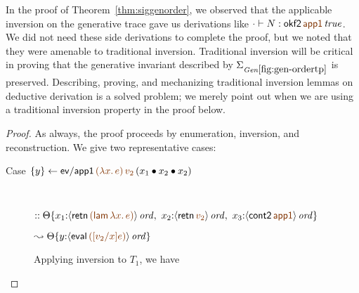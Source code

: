 \bigskip
In the proof of Theorem~\ref{thm:siggenorder}, we observed that the
applicable inversion on the generative trace gave us derivations like
$\cdot \vdash N : \isconc{{{\sf okf2}\,\lf{\sf app1}}}$. We did not need these
side derivations to complete the proof, but we noted that they were
amenable to traditional inversion. Traditional inversion will be
critical in proving that the generative invariant described by
$\siggenordertp$ is preserved. Describing, proving, and mechanizing
traditional inversion lemmas on deductive derivation is a solved
problem; we merely point out when we are using a traditional inversion
property in the proof below.


\begin{proof} As always, the proof proceeds by enumeration, inversion,
  and reconstruction. We give two representative cases: 

\begin{description}

\item 
  [Case $\trstep{y}{{\sf ev/app1}\,\lf{(\lambda x.\,e)}\,\lf{v_2}\,(\tfuser{x_1}{\tfuser{x_2}{x_2}})}$]~

\qquad
  $::
   \tackon{\Theta}{x_1{:}\istrue{\susp{{\sf retn}\,\lf{({\sf lam}\,\lambda x.\,e)}}}, ~
                   x_2{:}\istrue{\susp{{\sf retn}\,\lf{v_2}}}, ~
                   x_3{:}\istrue{\susp{{\sf cont2}\,\lf{\sf app1}}}}$

\qquad\qquad
  $\leadsto
   \tackon{\Theta}{y{:}\istrue{\susp{{\sf eval}\,\lf{([v_2/x]e)}}}}$

\medskip
Applying inversion to $T_1$, we have


\end{description}
\end{proof}
